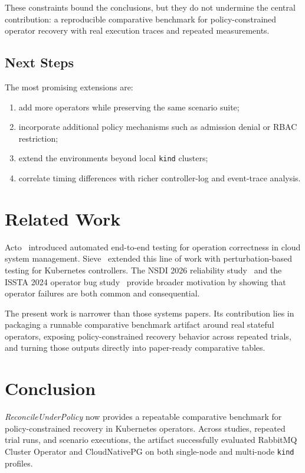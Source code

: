 \documentclass[sigconf,screen]{acmart}
\begin{document}
These constraints bound the conclusions, but they do not undermine the central
contribution: a reproducible comparative benchmark for policy-constrained
operator recovery with real execution traces and repeated measurements.

\subsection{Next Steps}

The most promising extensions are:

\begin{enumerate}
  \item add more operators while preserving the same scenario suite;
  \item incorporate additional policy mechanisms such as admission denial or
  RBAC restriction;
  \item extend the environments beyond local \texttt{kind} clusters;
  \item correlate timing differences with richer controller-log and event-trace
  analysis.
\end{enumerate}

\section{Related Work}

Acto~\cite{acto} introduced automated end-to-end testing for operation
correctness in cloud system management. Sieve~\cite{sieve} extended this line
of work with perturbation-based testing for Kubernetes controllers. The NSDI
2026 reliability study~\cite{watchers} and the ISSTA 2024 operator bug
study~\cite{issta-bugs} provide broader motivation by showing that operator
failures are both common and consequential.

The present work is narrower than those systems papers. Its contribution lies
in packaging a runnable comparative benchmark artifact around real stateful
operators, exposing policy-constrained recovery behavior across repeated trials,
and turning those outputs directly into paper-ready comparative tables.

\section{Conclusion}

\emph{ReconcileUnderPolicy} now provides a repeatable comparative benchmark for
policy-constrained recovery in Kubernetes operators. Across \RUPStudyCount{}
studies, \RUPTotalTrials{} repeated trial runs, and \RUPScenarioExecutions{}
scenario executions, the artifact successfully evaluated RabbitMQ Cluster
Operator and CloudNativePG on both single-node and multi-node \texttt{kind}
profiles.
\end{document}
